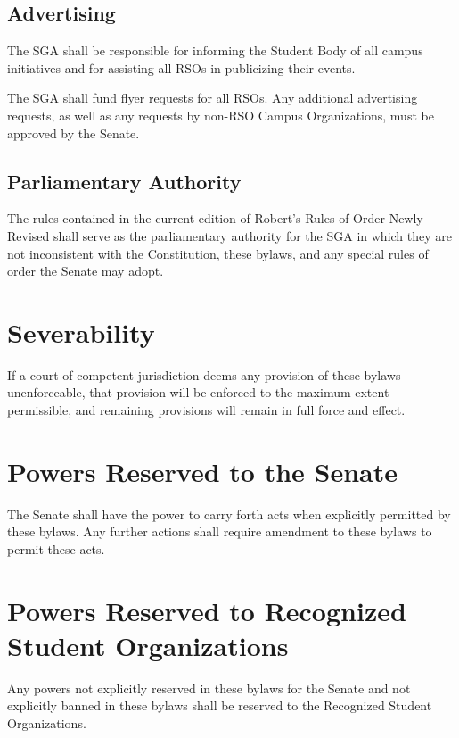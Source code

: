 \documentclass[12pt]{scrreprt}
\begin{document}
\section{Advertising}
The SGA shall be responsible for informing the Student Body of all campus 
initiatives and for assisting all RSOs in publicizing their events. 

The SGA shall fund flyer requests for all RSOs. Any additional advertising 
requests, as well as any requests by non-RSO Campus Organizations, must be 
approved by the Senate. 

\section{Parliamentary Authority} 
The rules contained in the current edition of Robert's Rules of Order Newly Revised shall serve
as the parliamentary authority for the SGA in which they are not inconsistent with the
Constitution, these bylaws, and any special rules of order the Senate may adopt.


\chapter{Severability}
If a court of competent jurisdiction deems any provision of these bylaws 
unenforceable, that provision will be enforced to the maximum extent 
permissible, and remaining provisions will remain in full force and effect. 

\chapter{Powers Reserved to the Senate} \label{sec:senate_powers}
The Senate shall have the power to carry forth acts when explicitly permitted 
by these bylaws. Any further actions shall require amendment to these bylaws 
to permit these acts. 

\chapter{Powers Reserved to Recognized Student Organizations} \label{sec:rso_powers}
Any powers not explicitly reserved in these bylaws for the Senate and not 
explicitly banned in these bylaws shall be reserved to the Recognized Student 
Organizations.
\end{document}
